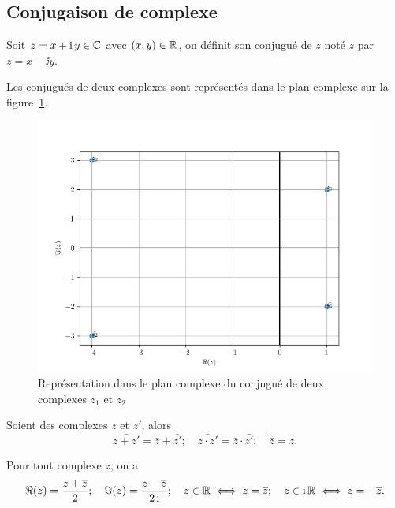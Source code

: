 \subsection{Conjugaison de complexe}
\label{subsec:conjugaisoncomplexe}
\begin{defdef}
    Soit \(z=x+\operatorname{i} y \in \mathbb{C}\) avec \((x,y)\in \mathbb{R}\), on définit son conjugué de 
    \(z\) noté \(\bar{z}\) par \(\bar{z}=x- \ii y\).
\end{defdef}
Les conjugués de deux complexes sont représentés dans le plan complexe sur la 
figure~\ref{fig:conjugueComplexe}.
\begin{figure}
    \centering
    \includegraphics[scale=0.8]{conjugue.png}
    \caption{Représentation dans le plan complexe du conjugué de deux complexes 
    $z_1$ et $z_2$}
    \label{fig:conjugueComplexe}
\end{figure}
\begin{prop}
    Soient des complexes \(z\) et \(z'\), alors
    \begin{equation}
        \bar{z+z'}=\bar{z} + \bar{z'}; \quad \bar{z \cdot z'}=\bar{z} \cdot 
        \bar{z'}; \quad \bar{\bar{z}}=z.
    \end{equation}
\end{prop}
\begin{prop}
    Pour tout complexe \(z\), on a
    \begin{equation}
        \Re(z)=\frac{z+\overline{z}}{2}; \quad \Im(z)=\frac{z-\overline{z}}{2 \operatorname{i}}; \quad 
        z \in \mathbb{R} \iff z=\overline{z}; \quad z \in \operatorname{i}\mathbb{R} \iff z=-\overline{z}.
    \end{equation}
\end{prop}
